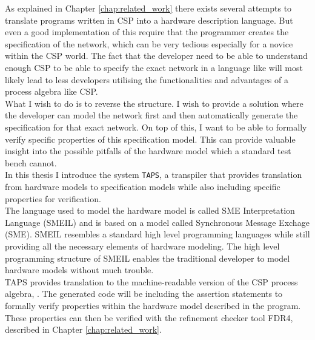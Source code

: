 %



As explained in Chapter \ref{chap:related_work} there exists several attempts to translate programs written in CSP into a hardware description language. But even a good implementation of this require that the programmer creates the specification of the network, which can be very tedious especially for a novice within the CSP world. The fact that the developer need to be able to understand enough CSP to be able to specify the exact network in a language like \cspm{} will most likely lead to less developers utilising the functionalities and advantages of a process algebra like CSP.\\

What I wish to do is to reverse the structure. I wish to provide a solution where the developer can model the network first and then automatically generate the specification for that exact network. On top of this, I want to be able to formally verify specific properties of this specification model. This can provide valuable insight into the possible pitfalls of the hardware model which a standard test bench cannot.\\

In this thesis I introduce the system \texttt{TAPS}, a transpiler that provides translation from hardware models to specification models while also including specific properties for verification.\\

The language used to model the hardware model is called SME Interpretation Language (SMEIL) and is based on a model called Synchronous Message Exchage (SME). SMEIL resembles a standard high level programming languages while still providing all the necessary elements of hardware modeling. The high level programming structure of SMEIL enables the traditional developer to model hardware models without much trouble. \\

TAPS provides translation to the machine-readable version of the CSP process algebra, \cspm{}. The generated \cspm{} code will be including the assertion statements to formally verify properties within the hardware model described in the \cspm{} program. These properties can then be verified with the \cspm{} refinement checker tool FDR4, described in Chapter \ref{chap:related_work}.